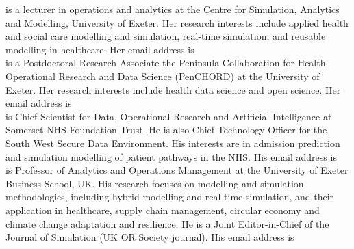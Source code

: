 \documentclass{swpaperproc}
\theoremstyle{sw}
\begin{document}
 is a lecturer in operations and analytics at the Centre for Simulation, Analytics and Modelling, University of Exeter. Her research interests include applied health and social care modelling and simulation, real-time simulation, and reusable modelling in healthcare. Her email address is  \\

 is a Postdoctoral Research Associate the Peninsula Collaboration for Health Operational Research and Data Science (PenCHORD) at the University of Exeter. Her research interests include health data science and open science. Her email address is  \\

 is Chief Scientist for Data, Operational Research and Artificial Intelligence at Somerset NHS Foundation Trust. He is also Chief Technology Officer for the South West Secure Data Environment.  His interests are  in admission prediction and simulation modelling of patient pathways in the NHS. His email address is  \\

 is Professor of Analytics and Operations Management at the University of Exeter Business School, UK. His research focuses on modelling and simulation methodologies, including hybrid modelling and real-time simulation, and their application in healthcare, supply chain management, circular economy and climate change adaptation and resilience. He is a Joint Editor-in-Chief of the Journal of Simulation (UK OR Society journal). His email address is  
\end{document}
